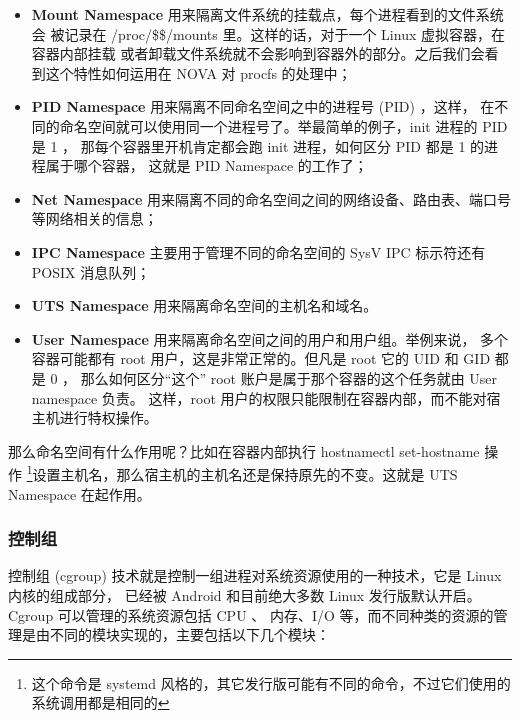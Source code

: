 \begin{itemize}
    \item \textbf{Mount Namespace} 用来隔离文件系统的挂载点，每个进程看到的文件系统会
    被记录在 /proc/\$\$/mounts 里。这样的话，对于一个 Linux 虚拟容器，在容器内部挂载
    或者卸载文件系统就不会影响到容器外的部分。之后我们会看到这个特性如何运用在 NOVA 对
    procfs 的处理中；
    \item \textbf{PID Namespace} 用来隔离不同命名空间之中的进程号 (PID) ，这样，
    在不同的命名空间就可以使用同一个进程号了。举最简单的例子，init 进程的 PID 是 1 ，
    那每个容器里开机肯定都会跑 init 进程，如何区分 PID 都是 1 的进程属于哪个容器，
    这就是 PID Namespace 的工作了；
    \item \textbf{Net Namespace} 用来隔离不同的命名空间之间的网络设备、路由表、端口号
    等网络相关的信息；
    \item \textbf{IPC Namespace} 主要用于管理不同的命名空间的 SysV IPC 标示符还有
    POSIX 消息队列；
    \item \textbf{UTS Namespace} 用来隔离命名空间的主机名和域名。
    \item \textbf{User Namespace} 用来隔离命名空间之间的用户和用户组。举例来说，
    多个容器可能都有 root 用户，这是非常正常的。但凡是 root 它的 UID 和 GID 都是 0 ，
    那么如何区分“这个” root 账户是属于那个容器的这个任务就由 User namespace 负责。
    这样，root 用户的权限只能限制在容器内部，而不能对宿主机进行特权操作。
\end{itemize}

那么命名空间有什么作用呢？比如在容器内部执行 hostnamectl set-hostname 操作
\footnote{这个命令是 systemd 风格的，其它发行版可能有不同的命令，不过它们使用的
系统调用都是相同的}设置主机名，那么宿主机的主机名还是保持原先的不变。这就是 UTS Namespace
在起作用。

\subsubsection{控制组}
\label{subsubsec:cgroup}

控制组 (cgroup) 技术就是控制一组进程对系统资源使用的一种技术，它是 Linux 内核的组成部分，
已经被 Android 和目前绝大多数 Linux 发行版默认开启。Cgroup 可以管理的系统资源包括 CPU 、
内存、I/O 等，而不同种类的资源的管理是由不同的模块实现的，主要包括以下几个模块：

